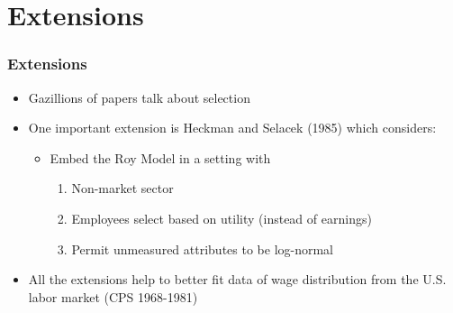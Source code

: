 \section{Extensions}

\begin{frame}
	\frametitle{Extensions}
		\begin{itemize}
			\item Gazillions of papers talk about selection
			\item One important extension is Heckman and Selacek (1985) which considers:
			\begin{itemize}
				\item Embed the Roy Model in a setting with
					\begin{enumerate}
						\item Non-market sector
						\item Employees select based on utility (instead of earnings)
						\item Permit unmeasured attributes to be log-normal
					\end{enumerate}
			\end{itemize}
			\item All the extensions help to better fit data of wage distribution from the U.S. labor market (CPS 1968-1981)
		\end{itemize}
\end{frame}

